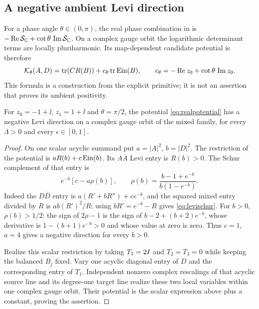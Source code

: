 \subsection{A negative ambient Levi direction}\label{subsec:levi}
For a phase angle $\theta\in(0,\pi)$, the real phase combination in
\cite[\S5.1]{hkkp26} is
$-\operatorname{Re}\mathcal S_{\mathbb C}+\cot\theta\,\operatorname{Im}\mathcal S_{\mathbb C}$.
On a complex gauge orbit the logarithmic determinant terms are locally
pluriharmonic. Its map-dependent candidate potential is therefore
\begin{equation}\label{eq:realpotential}
 \mathcal K_\theta(A,D)=\operatorname{tr}(CR(B))+c_\theta\operatorname{tr}\operatorname{Ein}(B),\qquad
 c_\theta=-\operatorname{Re} z_0+\cot\theta\,\operatorname{Im} z_0 .
\end{equation}
This formula is a construction from the explicit primitive; it is not
an assertion that \cite[\S5.4]{hkkp26} proves its ambient positivity.

\begin{proposition}\label{prop:negativelevi}
For $z_0=-1+\ii$, $z_1=1+\ii$ and $\theta=\pi/2$, the potential
\eqref{eq:realpotential} has a negative Levi direction on a complex
gauge orbit of the mixed family, for every $\Lambda>0$ and every
$\epsilon\in[0,1]$.
\end{proposition}

\begin{proof}
On one scalar acyclic summand put $a=|A|^2$, $b=|D|^2$.
The restriction of the potential is $aR(b)+c\operatorname{Ein}(b)$.
Its $A\overline A$ Levi entry is $R(b)>0$.
The Schur complement of that entry is
\begin{equation}\label{eq:levischur}
 e^{-b}[c-a\rho(b)],\qquad
 \rho(b)=\frac{b-1+e^{-b}}{b(1-e^{-b})}.
\end{equation}
Indeed the $D\overline D$ entry is
$a(R'+bR'')+ce^{-b}$, and the squared mixed entry divided by
$R$ is $ab(R')^2/R$; using $bR'=e^{-b}-R$ gives
\eqref{eq:levischur}.
For $b>0$, $\rho(b)>1/2$: the sign of $2\rho-1$ is the sign
of $b-2+(b+2)e^{-b}$, whose derivative is
$1-(b+1)e^{-b}>0$ and whose value at zero is zero.
Thus $c=1$, $a=4$ gives a negative direction for every $b>0$.

Realize this scalar restriction by taking $T_1=2I$ and $T_2=T_3=0$
while keeping the balanced $B_j$ fixed. Vary one acyclic diagonal
entry of $D$ and the corresponding entry of $T_1$.
Independent nonzero complex rescalings of that acyclic source line
and its degree-one target line realize these two local variables
within one complex gauge orbit. Their potential is the scalar
expression above plus a constant, proving the assertion.
\end{proof}

